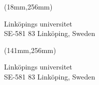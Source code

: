 \documentclass[a4paper]{memoir}
\begin{document}
\fontsize{12}{14pt}\selectfont
\begin{textblock*}{52mm}(18mm,256mm)
  \begin{centering}
    Linköpings universitet\\
    SE-581 83 Linköping, Sweden
  \end{centering}
\end{textblock*}


\fontsize{12}{14pt}\selectfont
\begin{textblock*}{52mm}(141mm,256mm)
  \begin{centering}
    Linköpings universitet\\
    SE-581 83 Linköping, Sweden
  \end{centering}
\end{textblock*}
\end{document}
